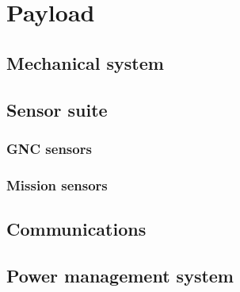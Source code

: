 \section*{Payload} \label{sec:payload}

\subsection*{Mechanical system} \label{subsec:payload-mechsystem}




\subsection*{Sensor suite} \label{subsec:payload-sensors}

\subsubsection*{GNC sensors}



\subsubsection*{Mission sensors}



\subsection*{Communications} \label{subsec:payload-comm}




\subsection*{Power management system} \label{subsec:payload-power}


